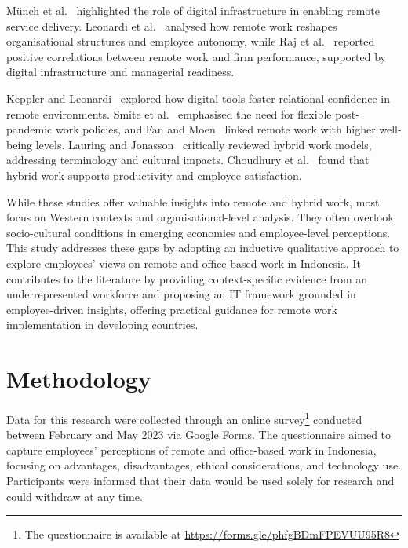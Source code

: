 \documentclass{infotel}
\begin{document}
Münch et al.~\cite{munch2022capabilities} highlighted the role of digital infrastructure in enabling remote service delivery. Leonardi et al.~\cite{Leonardi2024RemoteWork} analysed how remote work reshapes organisational structures and employee autonomy, while Raj et al.~\cite{Raj2023Remote} reported positive correlations between remote work and firm performance, supported by digital infrastructure and managerial readiness.

Keppler and Leonardi~\cite{Keppler2023RelationalConfidence} explored how digital tools foster relational confidence in remote environments. Smite et al.~\cite{Smite2023WFHFlexibility} emphasised the need for flexible post-pandemic work policies, and Fan and Moen~\cite{Fan2023SubjectiveWellbeing} linked remote work with higher well-being levels. Lauring and Jonasson~\cite{Lauring2024Hybrid} critically reviewed hybrid work models, addressing terminology and cultural impacts. Choudhury et al.~\cite{Choudhury2024Hybrid} found that hybrid work supports productivity and employee satisfaction.

While these studies offer valuable insights into remote and hybrid work, most focus on Western contexts and organisational-level analysis. They often overlook socio-cultural conditions in emerging economies and employee-level perceptions. This study addresses these gaps by adopting an inductive qualitative approach to explore employees’ views on remote and office-based work in Indonesia. It contributes to the literature by providing context-specific evidence from an underrepresented workforce and proposing an IT framework grounded in employee-driven insights, offering practical guidance for remote work implementation in developing countries.



\section{Methodology}
\label{sec:methodology}

Data for this research were collected through an online survey\footnote{The questionnaire is available at \url{https://forms.gle/phfgBDmFPEVUU95R8}
} conducted between February and May 2023 via Google Forms. The questionnaire aimed to capture employees' perceptions of remote and office-based work in Indonesia, focusing on advantages, disadvantages, ethical considerations, and technology use. Participants were informed that their data would be used solely for research and could withdraw at any time.
\end{document}

